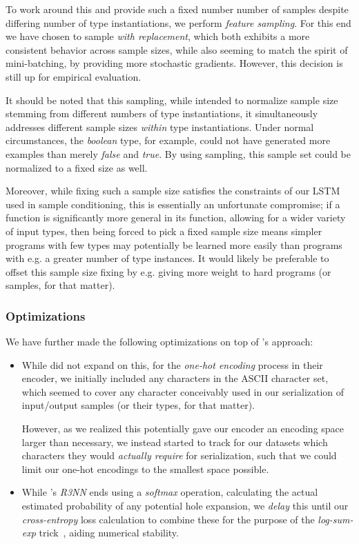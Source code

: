 \documentclass{article}
\begin{document}
    To work around this and provide such a fixed number number of samples despite differing number of type instantiations,
    we perform \emph{feature sampling}.
    For this end we have chosen to sample \emph{with replacement},
    which both exhibits a more consistent behavior across sample sizes,
    while also seeming to match the spirit of mini-batching,
    by providing more stochastic gradients.
    However, this decision is still up for empirical evaluation.

    It should be noted that this sampling,
    while intended to normalize sample size stemming from different numbers of type instantiations,
    it simultaneously addresses different sample sizes \emph{within} type instantiations.
    Under normal circumstances, the \emph{boolean} type, for example,
    could not have generated more examples than merely \emph{false} and \emph{true}.
    By using sampling, this sample set could be normalized to a fixed size as well.

    Moreover, while fixing such a sample size satisfies the constraints of our LSTM used in sample conditioning,
    this is essentially an unfortunate compromise;
    if a function is significantly more general in its function,
    allowing for a wider variety of input types,
    then being forced to pick a fixed sample size means simpler programs with few types may potentially be learned more easily than programs with e.g. a greater number of type instances.
    It would likely be preferable to offset this sample size fixing by e.g. giving more weight to hard programs (or samples, for that matter).
    

\subsubsection{Optimizations}

We have further made the following optimizations on top of \citet{nsps}'s approach:
\begin{itemize}
    \item While \citet{nsps} did not expand on this,
    for the \emph{one-hot encoding} process in their encoder,
    we initially included any characters in the ASCII character set,
    which seemed to cover any character conceivably used in our serialization of input/output samples (or their types, for that matter).

    However, as we realized this potentially gave our encoder an encoding space larger than necessary,
    we instead started to track for our datasets which characters they would \emph{actually require} for serialization,
    such that we could limit our one-hot encodings to the smallest space possible.
    \item While \citet{nsps}'s \emph{R3NN} ends using a \emph{softmax} operation,
    calculating the actual estimated probability of any potential hole expansion,
    we \emph{delay} this until our \emph{cross-entropy} loss calculation to combine these for the purpose of the \emph{log-sum-exp} trick~\citep{eisele2016log},
    aiding numerical stability.
\end{itemize}
\end{document}
